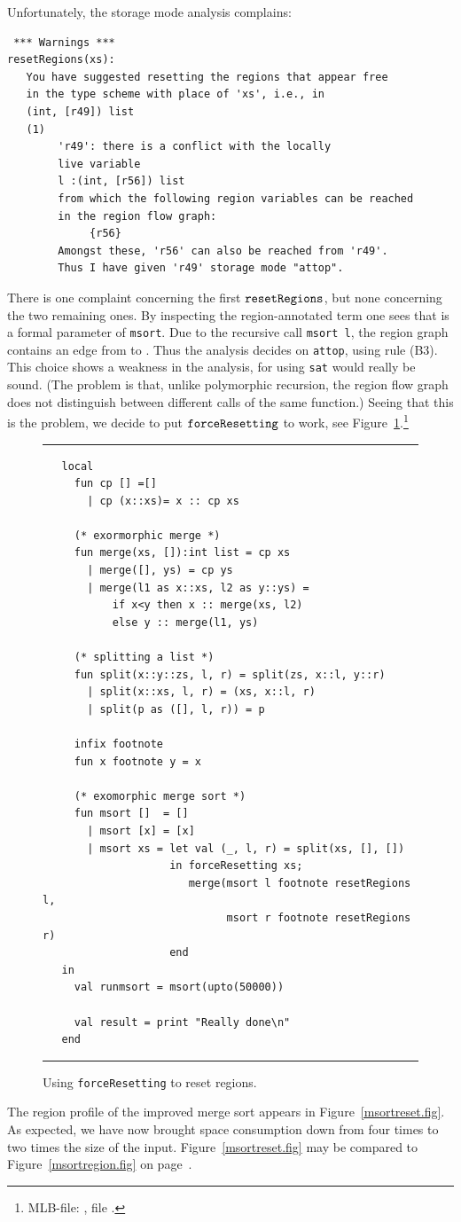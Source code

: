 \documentclass[12pt]{book}
\begin{document}
Unfortunately, the storage mode analysis complains:
\begin{verbatim}
 *** Warnings ***
resetRegions(xs): 
   You have suggested resetting the regions that appear free 
   in the type scheme with place of 'xs', i.e., in
   (int, [r49]) list
   (1)                                                    
        'r49': there is a conflict with the locally
        live variable
        l :(int, [r56]) list
        from which the following region variables can be reached 
        in the region flow graph:
             {r56}
        Amongst these, 'r56' can also be reached from 'r49'.
        Thus I have given 'r49' storage mode "attop".
\end{verbatim}
There is one complaint concerning the first $\hbox{\tt resetRegions}$, but none
concerning the two remaining ones.  By inspecting the region-annotated
term one sees that  is a formal parameter of {\tt msort}.
Due to the recursive call {\tt msort l}, the region graph contains an
edge from  to . Thus the analysis decides on
{\tt attop}, using rule (B3). This choice shows a weakness in the
analysis, for using {\tt sat} would really be sound. (The problem is
that, unlike polymorphic recursion, the region flow graph does not
distinguish between different calls of the same function.)  Seeing
that this is the problem, we decide to put $\hbox{\tt forceResetting}$ to work, see
Figure~\ref{force.fig}.\footnote{MLB-file:
  , file
  .}
\begin{figure}
\hrule\medskip
\begin{verbatim}
   local
     fun cp [] =[]
       | cp (x::xs)= x :: cp xs

     (* exormorphic merge *)
     fun merge(xs, []):int list = cp xs
       | merge([], ys) = cp ys
       | merge(l1 as x::xs, l2 as y::ys) = 
           if x<y then x :: merge(xs, l2) 
           else y :: merge(l1, ys)

     (* splitting a list *)
     fun split(x::y::zs, l, r) = split(zs, x::l, y::r)
       | split(x::xs, l, r) = (xs, x::l, r)
       | split(p as ([], l, r)) = p

     infix footnote
     fun x footnote y = x

     (* exomorphic merge sort *)
     fun msort []  = []
       | msort [x] = [x]
       | msort xs = let val (_, l, r) = split(xs, [], [])
                    in forceResetting xs;
                       merge(msort l footnote resetRegions l, 
                             msort r footnote resetRegions r)
                    end
   in
     val runmsort = msort(upto(50000))

     val result = print "Really done\n"
   end
\end{verbatim}
\caption{Using {\tt forceResetting} to reset regions.}
\medskip
\hrule
\label{force.fig}
\end{figure}
The region profile of the improved merge sort appears in
Figure~\ref{msortreset.fig}. As expected, we have now brought space
consumption down from four times to two times the size of the input.
Figure~\ref{msortreset.fig} may be compared to
Figure~\ref{msortregion.fig} on page~\pageref{msortregion.fig}.
\end{document}

